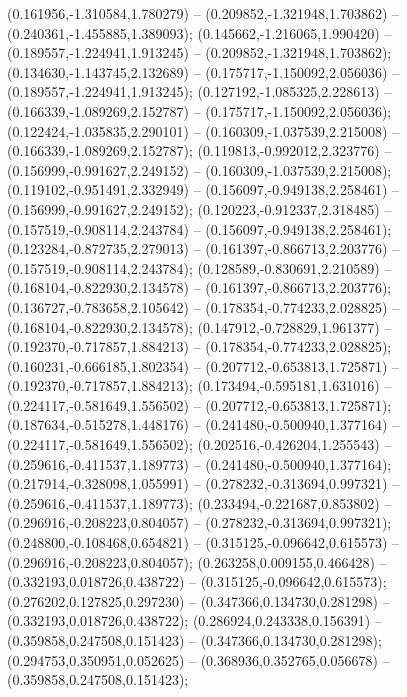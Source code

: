  (0.161956,-1.310584,1.780279) -- (0.209852,-1.321948,1.703862) -- (0.240361,-1.455885,1.389093);
 (0.145662,-1.216065,1.990420) -- (0.189557,-1.224941,1.913245) -- (0.209852,-1.321948,1.703862);
 (0.134630,-1.143745,2.132689) -- (0.175717,-1.150092,2.056036) -- (0.189557,-1.224941,1.913245);
 (0.127192,-1.085325,2.228613) -- (0.166339,-1.089269,2.152787) -- (0.175717,-1.150092,2.056036);
 (0.122424,-1.035835,2.290101) -- (0.160309,-1.037539,2.215008) -- (0.166339,-1.089269,2.152787);
 (0.119813,-0.992012,2.323776) -- (0.156999,-0.991627,2.249152) -- (0.160309,-1.037539,2.215008);
 (0.119102,-0.951491,2.332949) -- (0.156097,-0.949138,2.258461) -- (0.156999,-0.991627,2.249152);
 (0.120223,-0.912337,2.318485) -- (0.157519,-0.908114,2.243784) -- (0.156097,-0.949138,2.258461);
 (0.123284,-0.872735,2.279013) -- (0.161397,-0.866713,2.203776) -- (0.157519,-0.908114,2.243784);
 (0.128589,-0.830691,2.210589) -- (0.168104,-0.822930,2.134578) -- (0.161397,-0.866713,2.203776);
 (0.136727,-0.783658,2.105642) -- (0.178354,-0.774233,2.028825) -- (0.168104,-0.822930,2.134578);
 (0.147912,-0.728829,1.961377) -- (0.192370,-0.717857,1.884213) -- (0.178354,-0.774233,2.028825);
 (0.160231,-0.666185,1.802354) -- (0.207712,-0.653813,1.725871) -- (0.192370,-0.717857,1.884213);
 (0.173494,-0.595181,1.631016) -- (0.224117,-0.581649,1.556502) -- (0.207712,-0.653813,1.725871);
 (0.187634,-0.515278,1.448176) -- (0.241480,-0.500940,1.377164) -- (0.224117,-0.581649,1.556502);
 (0.202516,-0.426204,1.255543) -- (0.259616,-0.411537,1.189773) -- (0.241480,-0.500940,1.377164);
 (0.217914,-0.328098,1.055991) -- (0.278232,-0.313694,0.997321) -- (0.259616,-0.411537,1.189773);
 (0.233494,-0.221687,0.853802) -- (0.296916,-0.208223,0.804057) -- (0.278232,-0.313694,0.997321);
 (0.248800,-0.108468,0.654821) -- (0.315125,-0.096642,0.615573) -- (0.296916,-0.208223,0.804057);
 (0.263258,0.009155,0.466428) -- (0.332193,0.018726,0.438722) -- (0.315125,-0.096642,0.615573);
 (0.276202,0.127825,0.297230) -- (0.347366,0.134730,0.281298) -- (0.332193,0.018726,0.438722);
 (0.286924,0.243338,0.156391) -- (0.359858,0.247508,0.151423) -- (0.347366,0.134730,0.281298);
 (0.294753,0.350951,0.052625) -- (0.368936,0.352765,0.056678) -- (0.359858,0.247508,0.151423);
